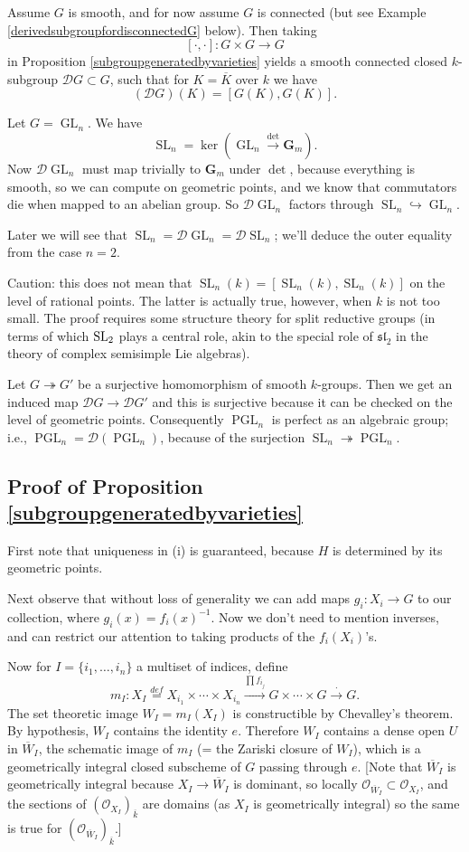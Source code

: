\documentclass[10pt]{article}
\newcommand{\cO}{\mathcal{O}}
\newcommand{\sD}{\mathscr{D}}
\newcommand{\GL}{\operatorname{GL}}
\newcommand{\PGL}{\operatorname{PGL}}
\newcommand{\SL}{\operatorname{SL}}
\renewcommand{\(}{\left(}
\renewcommand{\)}{\right)}
\renewcommand{\bar}{\overline}
\newcommand{\into}{\hookrightarrow}
\newcommand{\onto}{\twoheadrightarrow }
\numberwithin{thm}{subsection}
\begin{document}
\begin{ex}\label{derivedsubgroup}Assume $G$ is smooth, and for now assume $G$ is connected (but see
Example \ref{derivedsubgroupfordisconnectedG} below).
Then taking \[[\cdot , \cdot]:G\times G\to G\]
in Proposition \ref{subgroupgeneratedbyvarieties}
yields a smooth connected closed $k$-subgroup
$\sD G\subset G$, such that for $K=\bar K$
over $k$ we have
\[(\sD G)(K)=[G(K),G(K)].\]
\end{ex}
\begin{ex}
Let $G=\GL_n$.
We have
\[\SL_n=\ker(\GL_n\stackrel{\det}{\to}\mathbf{G}_m).\]
Now $\sD \GL_n$ must map trivially to $\mathbf{G}_m$ under
$\det$,
because everything is smooth, so we can compute on geometric points,
and we know that commutators die when mapped to an abelian group.
So $\sD\GL_n$ factors through $\SL_n\into \GL_n$.

Later we will see that $\SL_n=\sD \GL_n = \sD \SL_n$;
we'll deduce the outer equality from the case $n=2$.

Caution: this does not mean that $\SL_n(k)=[\SL_n(k),\SL_n(k)]$
on the level of rational points. The latter is actually true, however, when $k$ is not too small. 
The proof requires some structure theory for split reductive groups
(in terms of which ${\rm{SL}}_2$ plays a central role, akin to the special role
of $\mathfrak{sl}_2$ in the theory of complex semisimple Lie algebras).
\end{ex}
\begin{ex}
Let $G\onto G'$ be a surjective homomorphism of smooth $k$-groups.
Then we get an induced map $\sD G\to \sD G'$ and this is surjective
because it can be checked on the level of geometric points.
Consequently $\PGL_n$ is perfect as an algebraic group; i.e., $\PGL_n=\sD(\PGL_n)$,
because of the surjection $\SL_n\onto \PGL_n$.
\end{ex}
\subsection{Proof of Proposition \ref{subgroupgeneratedbyvarieties}}
First note that uniqueness in (i) is guaranteed, because $H$ is determined by its geometric points.

Next observe that without loss of generality we can add maps
$g_i:X_i\to G$ to our collection,
where $g_i(x)=f_i(x)^{-1}$.
Now we don't need to mention inverses, and can restrict our attention to taking products of the $f_i(X_i)$'s.

Now for $I=\{i_1,\ldots, i_n\}$ a multiset of indices, define
\[m_I:X_I\stackrel{def}{=}X_{i_1}\times\cdots\times X_{i_n}\stackrel{\prod f_{i_j}}{\to} G\times\cdots\times G\stackrel{\cdot}{\to} G.\]
The set theoretic image $W_I=m_I(X_I)$ is constructible by Chevalley's theorem.
By hypothesis, $W_I$ contains the identity $e$.
Therefore $W_I$ contains a dense open $U$
in $\bar W_I$, the schematic image of $m_I$
(= the Zariski closure of $W_I$),
which is a geometrically integral closed subscheme of $G$
passing through $e$.
[Note that $\bar W_I$ is geometrically integral
because $X_I\to \bar W_I$ is dominant,
so locally $\cO_{\bar W_I}\subset \cO_{X_I}$,
and the sections of $(\cO_{X_I})_{\bar k}$ are domains (as $X_I$ is geometrically integral) so the same is true for $(\cO_{\bar W_I})_{\bar k}$.]
\end{document}
